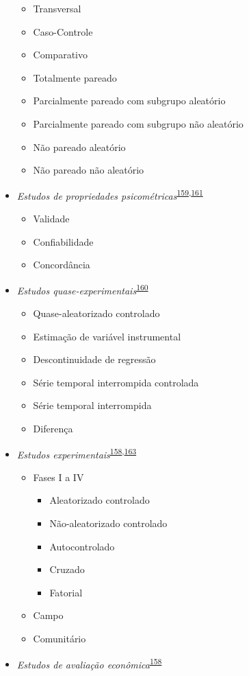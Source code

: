 \documentclass[
  a4paper,
]{book}
\begin{document}
\begin{itemize}
  \begin{itemize}
  \item
    Transversal
  \item
    Caso-Controle
  \item
    Comparativo
  \item
    Totalmente pareado
  \item
    Parcialmente pareado com subgrupo aleatório
  \item
    Parcialmente pareado com subgrupo não aleatório
  \item
    Não pareado aleatório
  \item
    Não pareado não aleatório
  \end{itemize}
\item
  \emph{Estudos de propriedades psicométricas}\textsuperscript{\protect\hyperlink{ref-Souza2017}{159},\protect\hyperlink{ref-echevarruxeda-guanilo2019}{161}}

  \begin{itemize}
  \item
    Validade
  \item
    Confiabilidade
  \item
    Concordância
  \end{itemize}
\item
  \emph{Estudos quase-experimentais}\textsuperscript{\protect\hyperlink{ref-reeves2017}{160}}

  \begin{itemize}
  \item
    Quase-aleatorizado controlado
  \item
    Estimação de variável instrumental
  \item
    Descontinuidade de regressão
  \item
    Série temporal interrompida controlada
  \item
    Série temporal interrompida
  \item
    Diferença
  \end{itemize}
\item
  \emph{Estudos experimentais}\textsuperscript{\protect\hyperlink{ref-Suxfct2014}{158},\protect\hyperlink{ref-Chidambaram2019}{163}}

  \begin{itemize}
  \item
    Fases I a IV

    \begin{itemize}
    \item
      Aleatorizado controlado
    \item
      Não-aleatorizado controlado
    \item
      Autocontrolado
    \item
      Cruzado
    \item
      Fatorial
    \end{itemize}
  \item
    Campo
  \item
    Comunitário
  \end{itemize}
\item
  \emph{Estudos de avaliação econômica}\textsuperscript{\protect\hyperlink{ref-Suxfct2014}{158}}


\end{itemize}
\end{document}

